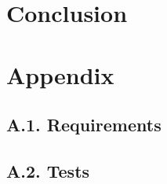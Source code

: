 \documentclass[11pt]{report}
\begin{document}
\chapter{Conclusion}\label{chapter:conclusion}


{}\label{bib:gsd}



\appendix

\chapter{Appendix}

\section{A.1. Requirements}

\section{A.2. Tests}
\end{document}
